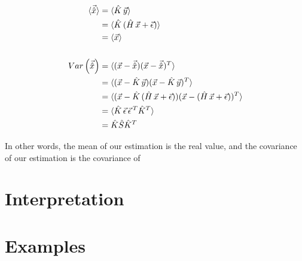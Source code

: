 \begin{align*}
    \braket{\vec{\hat{x}}}&=\braket{\hat{K}\,\vec{y}}
    \\
    &=\braket{\hat{K}\,(\hat{H}\,\vec{x}+\vec{\epsilon})}
    \\
    &=\braket{\vec{x}}
    \\
    \\
    Var\left(\vec{\hat{x}}\right)&
    =\braket{(\vec{x}-\vec{\hat{x}})(\vec{x}-\vec{\hat{x}})^T}
    \\
    &=\braket{(\vec{x}-\hat{K}\,\vec{y})(\vec{x}-\hat{K}\,\vec{y})^T}
    \\
    &
    =\braket{(\vec{x}-\hat{K}\,(\hat{H}\,\vec{x}+\vec{\epsilon}))(\vec{x}-(\hat{H}\,\vec{x}+\vec{\epsilon}))^T}
    \\
    &=\braket{\hat{K}\,\vec{\epsilon}\,\vec{\epsilon}\,^T\hat{K}^T}
    \\
    &=\hat{K}\hat{S}\hat{K}^T
\end{align*}

In other words, the mean of our estimation is the real value, and the covariance of our estimation is the covariance of 

\section{Interpretation}

\section{Examples}